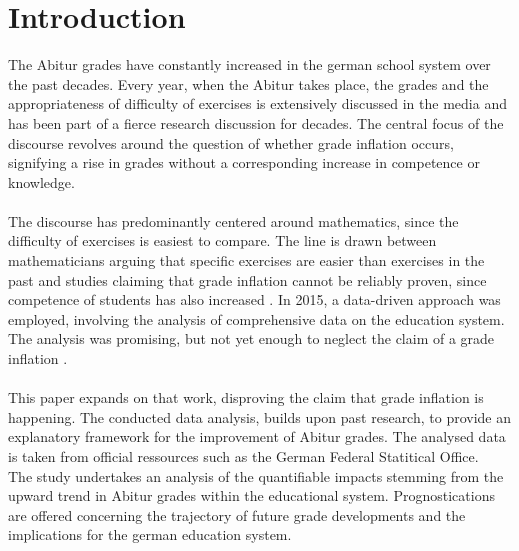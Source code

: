 \section{Introduction}
The Abitur grades have constantly increased in the german school system over the past decades. Every year, when the Abitur takes place, the grades and the appropriateness of difficulty of exercises is extensively discussed in the media and has been part of a fierce research discussion for decades. The central focus of the discourse revolves around the question of whether grade inflation occurs, signifying a rise in grades without a corresponding increase in competence or knowledge. \\\\
The discourse has predominantly centered around mathematics, since the difficulty of exercises is easiest to compare. The line is drawn between mathematicians arguing that specific exercises are easier than exercises in the past \cite{kuhnel2015modellierungskompetenz} \cite{JahnkeKleinKühnelSonarSpindler+2014+115+122} \cite{lemmermeyer2019zentralabitur} and studies claiming that grade inflation cannot be reliably proven, since competence of students has also increased \cite{Schleithoff+2015+3+26}. 
In 2015, a data-driven approach was employed, involving the analysis of comprehensive data on the education system. The analysis was promising, but not yet enough to neglect the claim of a grade inflation \cite{doi:10.7788/bue-2015-0407}.\\\\
This paper expands on that work, disproving the claim that grade inflation is happening. The conducted data analysis, builds upon past research, to provide an explanatory framework for the improvement of Abitur grades. The analysed data is taken from official ressources such as the German Federal Statitical Office. \\
The study undertakes an analysis of the quantifiable impacts stemming from the upward trend in Abitur grades within the educational system.
Prognostications are offered concerning the trajectory of future grade developments and the implications for the german education system.
